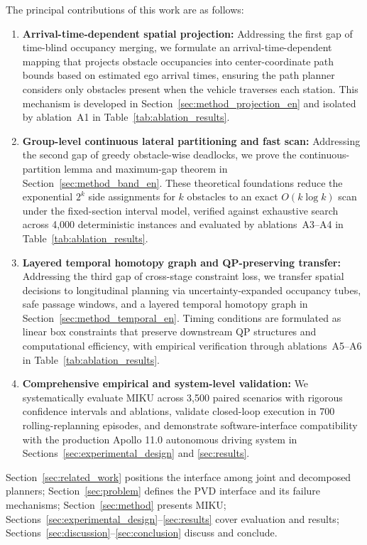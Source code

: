 The principal contributions of this work are as follows:
\begin{enumerate}
  \item \textbf{Arrival-time-dependent spatial projection:} Addressing the first gap of time-blind occupancy merging, we formulate an arrival-time-dependent mapping that projects obstacle occupancies into center-coordinate path bounds based on estimated ego arrival times, ensuring the path planner considers only obstacles present when the vehicle traverses each station. This mechanism is developed in Section~\ref{sec:method_projection_en} and isolated by ablation~A1 in Table~\ref{tab:ablation_results}.
  \item \textbf{Group-level continuous lateral partitioning and fast scan:} Addressing the second gap of greedy obstacle-wise deadlocks, we prove the continuous-partition lemma and maximum-gap theorem in Section~\ref{sec:method_band_en}. These theoretical foundations reduce the exponential $2^k$ side assignments for $k$ obstacles to an exact $O(k\log k)$ scan under the fixed-section interval model, verified against exhaustive search across 4,000 deterministic instances and evaluated by ablations~A3--A4 in Table~\ref{tab:ablation_results}.
  \item \textbf{Layered temporal homotopy graph and QP-preserving transfer:} Addressing the third gap of cross-stage constraint loss, we transfer spatial decisions to longitudinal planning via uncertainty-expanded occupancy tubes, safe passage windows, and a layered temporal homotopy graph in Section~\ref{sec:method_temporal_en}. Timing conditions are formulated as linear box constraints that preserve downstream QP structures and computational efficiency, with empirical verification through ablations~A5--A6 in Table~\ref{tab:ablation_results}.
  \item \textbf{Comprehensive empirical and system-level validation:} We systematically evaluate MIKU across 3,500 paired scenarios with rigorous confidence intervals and ablations, validate closed-loop execution in 700 rolling-replanning episodes, and demonstrate software-interface compatibility with the production Apollo 11.0 autonomous driving system in Sections~\ref{sec:experimental_design} and \ref{sec:results}.
\end{enumerate}

Section~\ref{sec:related_work} positions the interface among joint and decomposed planners; Section~\ref{sec:problem} defines the PVD interface and its failure mechanisms; Section~\ref{sec:method} presents MIKU; Sections~\ref{sec:experimental_design}--\ref{sec:results} cover evaluation and results; Sections~\ref{sec:discussion}--\ref{sec:conclusion} discuss and conclude.
